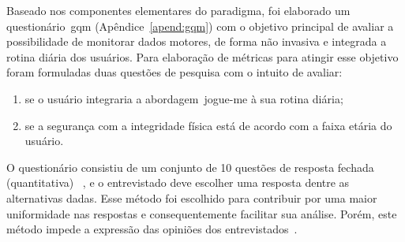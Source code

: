 Baseado nos componentes elementares do paradigma, foi elaborado um questionário~\ac{gqm} (Apêndice~\ref{apend:gqm}) com o objetivo principal de avaliar a possibilidade de monitorar dados motores, de forma não invasiva e integrada a rotina diária dos usuários. Para elaboração de métricas para atingir esse objetivo foram formuladas duas questões de pesquisa com o intuito de avaliar:
\begin{enumerate}
	\item se o usuário integraria a abordagem~\ac{jogue-me} à sua rotina diária;
	\item se a segurança com a integridade física está de acordo com a faixa etária do usuário.
\end{enumerate}

O questionário consistiu de um conjunto de 10 questões de resposta fechada (quantitativa) ~\cite{elicquest05}, e o entrevistado deve escolher uma resposta dentre as alternativas dadas. Esse método foi escolhido para contribuir por uma maior uniformidade nas respostas e consequentemente facilitar sua análise. Porém, este método impede a expressão das opiniões dos entrevistados~\cite{elicquest05}. 

